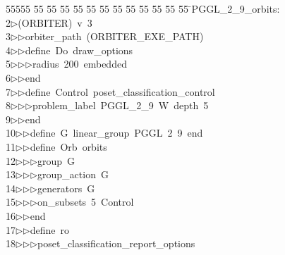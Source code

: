 %
%
\begin{tabbing}
55555 \= 55 \= 55 \= 55 \= 55 \= 55 \= 55 \= 55 \= 55 \= 55 \= 55 \= 55 \= 55 \= \>PGGL\_2\_9\_orbits:\\[0pt]
2\>$\triangleright$\>(ORBITER)\ v\ 3\ \\[0pt]
3\>$\triangleright$\>$\triangleright$\>orbiter\_path\ (ORBITER\_EXE\_PATH)\ \\[0pt]
4\>$\triangleright$\>$\triangleright$\>define\ Do\ draw\_options\ \\[0pt]
5\>$\triangleright$\>$\triangleright$\>$\triangleright$\>radius\ 200\ embedded\ \\[0pt]
6\>$\triangleright$\>$\triangleright$\>end\ \\[0pt]
7\>$\triangleright$\>$\triangleright$\>define\ Control\ poset\_classification\_control\ \\[0pt]
8\>$\triangleright$\>$\triangleright$\>$\triangleright$\>problem\_label\ PGGL\_2\_9\ W\ depth\ 5\ \\[0pt]
9\>$\triangleright$\>$\triangleright$\>end\ \\[0pt]
10\>$\triangleright$\>$\triangleright$\>define\ G\ linear\_group\ PGGL\ 2\ 9\ end\ \\[0pt]
11\>$\triangleright$\>$\triangleright$\>define\ Orb\ orbits\ \\[0pt]
12\>$\triangleright$\>$\triangleright$\>$\triangleright$\>group\ G\ \\[0pt]
13\>$\triangleright$\>$\triangleright$\>$\triangleright$\>group\_action\ G\ \\[0pt]
14\>$\triangleright$\>$\triangleright$\>$\triangleright$\>generators\ G\ \\[0pt]
15\>$\triangleright$\>$\triangleright$\>$\triangleright$\>on\_subsets\ 5\ Control\ \\[0pt]
16\>$\triangleright$\>$\triangleright$\>end\ \\[0pt]
17\>$\triangleright$\>$\triangleright$\>define\ ro\ \\[0pt]
18\>$\triangleright$\>$\triangleright$\>$\triangleright$\>poset\_classification\_report\_options\ \\[0pt]

\end{tabbing}

